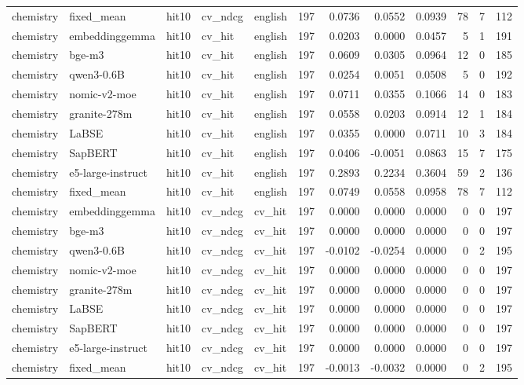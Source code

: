 \begin{tabular}{lllllrrrrrrr}
chemistry & fixed\_mean & hit10 & cv\_ndcg & english & 197 & 0.0736 & 0.0552 & 0.0939 & 78 & 7 & 112 \\
chemistry & embeddinggemma & hit10 & cv\_hit & english & 197 & 0.0203 & 0.0000 & 0.0457 & 5 & 1 & 191 \\
chemistry & bge-m3 & hit10 & cv\_hit & english & 197 & 0.0609 & 0.0305 & 0.0964 & 12 & 0 & 185 \\
chemistry & qwen3-0.6B & hit10 & cv\_hit & english & 197 & 0.0254 & 0.0051 & 0.0508 & 5 & 0 & 192 \\
chemistry & nomic-v2-moe & hit10 & cv\_hit & english & 197 & 0.0711 & 0.0355 & 0.1066 & 14 & 0 & 183 \\
chemistry & granite-278m & hit10 & cv\_hit & english & 197 & 0.0558 & 0.0203 & 0.0914 & 12 & 1 & 184 \\
chemistry & LaBSE & hit10 & cv\_hit & english & 197 & 0.0355 & 0.0000 & 0.0711 & 10 & 3 & 184 \\
chemistry & SapBERT & hit10 & cv\_hit & english & 197 & 0.0406 & -0.0051 & 0.0863 & 15 & 7 & 175 \\
chemistry & e5-large-instruct & hit10 & cv\_hit & english & 197 & 0.2893 & 0.2234 & 0.3604 & 59 & 2 & 136 \\
chemistry & fixed\_mean & hit10 & cv\_hit & english & 197 & 0.0749 & 0.0558 & 0.0958 & 78 & 7 & 112 \\
chemistry & embeddinggemma & hit10 & cv\_ndcg & cv\_hit & 197 & 0.0000 & 0.0000 & 0.0000 & 0 & 0 & 197 \\
chemistry & bge-m3 & hit10 & cv\_ndcg & cv\_hit & 197 & 0.0000 & 0.0000 & 0.0000 & 0 & 0 & 197 \\
chemistry & qwen3-0.6B & hit10 & cv\_ndcg & cv\_hit & 197 & -0.0102 & -0.0254 & 0.0000 & 0 & 2 & 195 \\
chemistry & nomic-v2-moe & hit10 & cv\_ndcg & cv\_hit & 197 & 0.0000 & 0.0000 & 0.0000 & 0 & 0 & 197 \\
chemistry & granite-278m & hit10 & cv\_ndcg & cv\_hit & 197 & 0.0000 & 0.0000 & 0.0000 & 0 & 0 & 197 \\
chemistry & LaBSE & hit10 & cv\_ndcg & cv\_hit & 197 & 0.0000 & 0.0000 & 0.0000 & 0 & 0 & 197 \\
chemistry & SapBERT & hit10 & cv\_ndcg & cv\_hit & 197 & 0.0000 & 0.0000 & 0.0000 & 0 & 0 & 197 \\
chemistry & e5-large-instruct & hit10 & cv\_ndcg & cv\_hit & 197 & 0.0000 & 0.0000 & 0.0000 & 0 & 0 & 197 \\
chemistry & fixed\_mean & hit10 & cv\_ndcg & cv\_hit & 197 & -0.0013 & -0.0032 & 0.0000 & 0 & 2 & 195 \\

\end{tabular}
